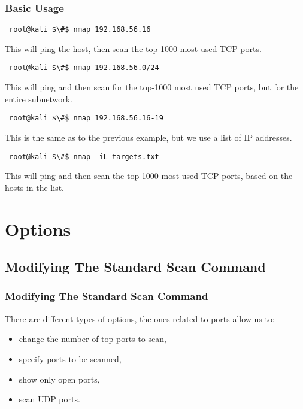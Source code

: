 \documentclass[aspectratio=169,xcolor=dvipsnames]{beamer}
\begin{document}
\begin{frame}[fragile]
    \frametitle{Basic Usage}
    \begin{lstlisting}
 root@kali $\#$ nmap 192.168.56.16
    \end{lstlisting}

    This will ping the host, then scan the top-1000 most used TCP ports.

    \pause

    \begin{lstlisting}
 root@kali $\#$ nmap 192.168.56.0/24
    \end{lstlisting}

    This will ping and then scan for the top-1000 most used TCP ports, but for the entire subnetwork.

    \pause

    \begin{lstlisting}
 root@kali $\#$ nmap 192.168.56.16-19
    \end{lstlisting}

    This is the same as to the previous example, but we use a list of IP addresses.

    \pause

    \begin{lstlisting}
 root@kali $\#$ nmap -iL targets.txt
    \end{lstlisting}

    This will ping and then scan the top-1000 most used TCP ports, based on the hosts in the list.

\end{frame}

\section{Options}

\subsection{Modifying The Standard Scan Command}

\begin{frame}
    \frametitle{Modifying The Standard Scan Command}

    There are different types of options, the ones related to ports allow us to:

    \begin{itemize}
        \item change the number of top ports to scan,
        \item specify ports to be scanned,
        \item show only open ports,
        \item scan UDP ports.
    \end{itemize}

\end{frame}
\end{document}
